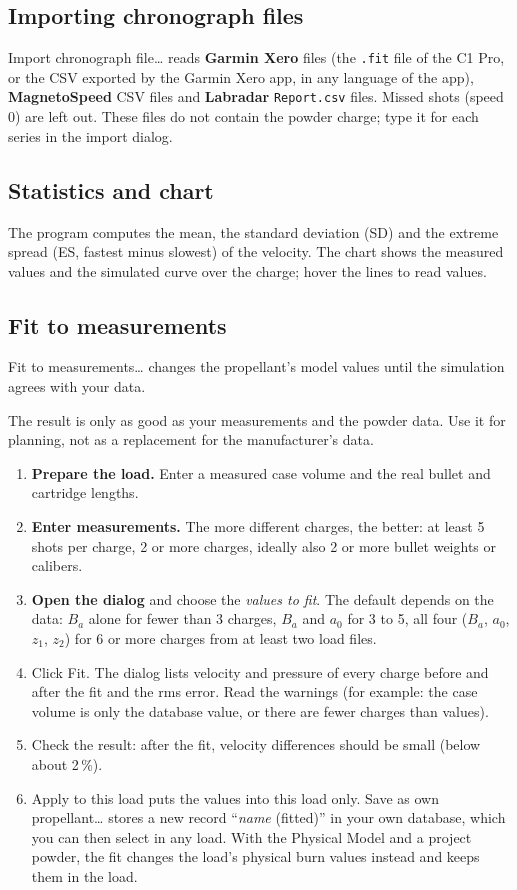 \documentclass[11pt,a4paper]{article}
\newcommand{\ui}[1]{\textsf{#1}}
\newcommand{\file}[1]{\texttt{#1}}
\begin{document}
\subsection{Importing chronograph files}
\ui{Import chronograph file\dots} reads \textbf{Garmin Xero} files (the \file{.fit} file of the C1 Pro, or the CSV exported by the Garmin Xero app, in any language of the app), \textbf{MagnetoSpeed} CSV files
and \textbf{Labradar} \file{Report.csv} files. Missed shots (speed 0) are left out. These files do not contain the powder charge;
type it for each series in the import dialog.

\subsection{Statistics and chart}
The program computes the mean, the standard deviation (SD) and the extreme spread (ES, fastest minus slowest) of the velocity. The chart shows the
measured values and the simulated curve over the charge; hover the lines to read values.

\subsection{Fit to measurements}
\ui{Fit to measurements\dots} changes the propellant's model values until the simulation agrees with your data.

\begin{warning}
The result is only as good as your measurements and the powder data. Use it for planning, not as a replacement for the manufacturer's data.
\end{warning}

\begin{enumerate}
  \item \textbf{Prepare the load.} Enter a measured case volume and the real bullet and cartridge lengths.
  \item \textbf{Enter measurements.} The more different charges, the better: at least 5 shots per charge, 2 or more charges, ideally also 2 or more bullet weights or calibers.
  \item \textbf{Open the dialog} and choose the \emph{values to fit}. The default depends on the data: $B_a$ alone for fewer than 3 charges,
        $B_a$ and $a_0$ for 3 to 5, all four ($B_a$, $a_0$, $z_1$, $z_2$) for 6 or more charges from at least two load files.
  \item Click \ui{Fit}. The dialog lists velocity and pressure of every charge before and after the fit and the rms error. Read the warnings
        (for example: the case volume is only the database value, or there are fewer charges than values).
  \item Check the result: after the fit, velocity differences should be small (below about 2\,\%).
  \item \ui{Apply to this load} puts the values into this load only. \ui{Save as own propellant\dots} stores a new record ``\textit{name} (fitted)''
        in your own database, which you can then select in any load. With the Physical Model and a project powder, the fit changes the load's physical burn
        values instead and keeps them in the load.
\end{enumerate}
\end{document}
